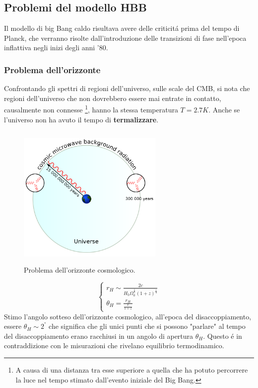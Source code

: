 \documentclass[12pt, a4paper]{article}
\begin{document}
\subsection{Problemi del modello HBB}
Il modello di big Bang caldo risultava avere delle criticit\'{a} prima del tempo di Planck, che verranno risolte dall'introduzione delle transizioni di fase nell'epoca inflattiva negli inizi degli anni '80.
\subsubsection{Problema dell'orizzonte}
Confrontando gli spettri di regioni dell'universo, sulle scale del CMB, si nota che regioni dell'universo che non dovrebbero essere mai entrate in contatto, causalmente non connesse \footnote{A causa di una distanza tra esse superiore a quella che ha potuto percorrere la luce nel tempo stimato dall'evento iniziale del Big Bang.}, hanno la stessa temperatura $T=2.7K$. Anche se l'universo non ha avuto il tempo di \textbf{termalizzare}.
\begin{figure}[htp]
    \centering
    \includegraphics[width=7cm, height=7cm]{images/orizzonte.png}
    \caption{Problema dell'orizzonte cosmologico.}
    \label{fig:orizzonte}
\end{figure}
\begin{equation}
    \begin{cases}
   r_H\sim \frac{2c}{H_0 \Omega_0^{\frac{1}{2}} (1+z)^{\frac{1}{3}}}
    \\
   \theta_H=\frac{r_H}{\frac{r}{1+z}}
    \end{cases}
\end{equation}
Stimo l'angolo sotteso dell'orizzonte cosmologico, all'epoca del disaccoppiamento, essere $\theta_H\sim 2^°$ che significa che gli unici punti che si possono "parlare" al tempo del disaccoppiamento erano racchiusi in un angolo di apertura $\theta_H$. Questo \'{e} in contraddizione con le misurazioni che rivelano equilibrio termodinamico.
\end{document}
